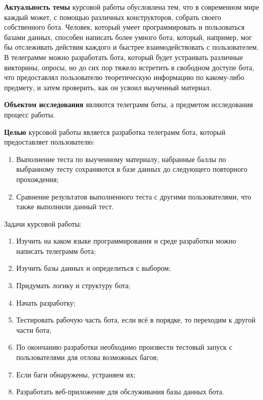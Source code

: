 \documentclass[12pt, oldlfont, amsfonts]{report}
\begin{document}
{\bf Актуальность темы} курсовой работы обусловлена тем, что в современном мире каждый может, с помощью различных конструкторов, собрать своего собственного бота. Человек, который умеет программировать и пользоваться базами данных, способен написать более умного бота, который, например, мог бы отслеживать действия каждого и быстрее взаимодействовать с пользователем. В телеграмме можно разработать бота, который будет устраивать различные викторины, опросы, но до сих пор тяжело встретить в свободном доступе бота, что предоставлял пользователю теоретическую информацию по какому-либо предмету, и затем проверить, как он усвоил выученный материал. 
	
{\bf Объектом исследования} являются телеграмм боты, а предметом исследования процесс работы.

{\bf Целью} курсовой работы является разработка телеграмм бота, который предоставляет пользователю: 
\begin{enumerate}
\item Выполнение теста по выученному материалу, набранные баллы по выбранному тесту сохраняются в базе данных до следующего повторного прохождения;
\item 	Сравнение результатов выполненного теста с другими пользователями, что также выполнили данный тест.
\end{enumerate}
	
Задачи курсовой работы:
\begin{enumerate}
\item Изучить на каком языке программирования и среде разработки можно написать телеграмм бота;
\item Изучить базы данных и определиться с выбором;
\item Придумать логику и структуру бота;
\item Начать разработку;
\item Тестировать рабочую часть бота, если всё в порядке, то переходим к другой части бота;
\item По окончанию разработки необходимо произвести тестовый запуск с пользователями для отлова возможных багов;
\item Если баги обнаружены, устраняем их;
\item Разработать веб-приложение для обслуживания базы данных бота.
\end{enumerate}

\setcounter{section}{0}
\setcounter{subsection}{0}
\setcounter{subsubsection}{0}
\setcounter{equation}{0}
\setcounter{section}{0}
\end{document}
